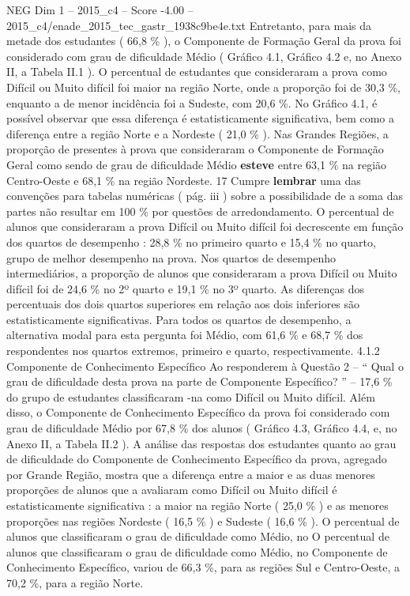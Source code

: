 \begin{textsample}{NEG Dim 1 – 2015\_c4 – Score -4.00 – 2015\_c4/enade\_2015\_tec\_gastr\_1938c9be4e.txt}
Entretanto, para mais da metade dos estudantes ( 66,8 \% ), o Componente de Formação Geral da prova foi considerado com grau de dificuldade Médio ( Gráfico 4.1, Gráfico 4.2 e, no Anexo II, a Tabela II.1 ).
O percentual de estudantes que consideraram a prova como Difícil ou Muito difícil foi maior na região Norte, onde a proporção foi de 30,3 \%, enquanto a de menor incidência foi a Sudeste, com 20,6 \%.
No Gráfico 4.1, é possível observar que essa diferença é estatisticamente significativa, bem como a diferença entre a região Norte e a Nordeste ( 21,0 \% ).
Nas Grandes Regiões, a proporção de presentes à prova que consideraram o Componente de Formação Geral como sendo de grau de dificuldade Médio \textbf{esteve} entre 63,1 \% na região Centro-Oeste e 68,1 \% na região Nordeste. 17 Cumpre \textbf{lembrar} uma das convenções para tabelas numéricas ( pág. iii ) sobre a possibilidade de a soma das partes não resultar em 100 \% por questões de arredondamento.
O percentual de alunos que consideraram a prova Difícil ou Muito difícil foi decrescente em função dos quartos de desempenho : 28,8 \% no primeiro quarto e 15,4 \% no quarto, grupo de melhor desempenho na prova.
Nos quartos de desempenho intermediários, a proporção de alunos que consideraram a prova Difícil ou Muito difícil foi de 24,6 \% no 2º quarto e 19,1 \% no 3º quarto.
As diferenças dos percentuais dos dois quartos superiores em relação aos dois inferiores são estatisticamente significativas.
Para todos os quartos de desempenho, a alternativa modal para esta pergunta foi Médio, com 61,6 \% e 68,7 \% dos respondentes nos quartos extremos, primeiro e quarto, respectivamente. 4.1.2 Componente de Conhecimento Específico Ao responderem à Questão 2 – “ Qual o grau de dificuldade desta prova na parte de Componente Específico? ” – 17,6 \% do grupo de estudantes classificaram -na como Difícil ou Muito difícil.
Além disso, o Componente de Conhecimento Específico da prova foi considerado com grau de dificuldade Médio por 67,8 \% dos alunos ( Gráfico 4.3, Gráfico 4.4, e, no Anexo II, a Tabela II.2 ).
A análise das respostas dos estudantes quanto ao grau de dificuldade do Componente de Conhecimento Específico da prova, agregado por Grande Região, mostra que a diferença entre a maior e as duas menores proporções de alunos que a avaliaram como Difícil ou Muito difícil é estatisticamente significativa : a maior na região Norte ( 25,0 \% ) e as menores proporções nas regiões Nordeste ( 16,5 \% ) e Sudeste ( 16,6 \% ).
O percentual de alunos que classificaram o grau de dificuldade como Médio, no O percentual de alunos que classificaram o grau de dificuldade como Médio, no Componente de Conhecimento Específico, variou de 66,3 \%, para as regiões Sul e Centro-Oeste, a 70,2 \%, para a região Norte.

\end{textsample}

